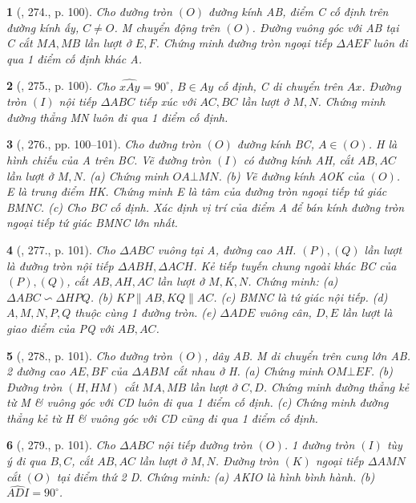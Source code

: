 \documentclass{article}
\newtheorem{baitoan}{}
\begin{document}
\begin{baitoan}[\cite{Binh_Toan_9_tap_2}, 274., p. 100]
	Cho đường tròn $(O)$ đường kính AB, điểm C cố định trên đường kính ấy, $C\ne O$. M chuyển động trên $(O)$. Đường vuông góc với AB tại C cắt $MA,MB$ lần lượt ở $E,F$. Chứng minh đường tròn ngoại tiếp $\Delta AEF$ luôn đi qua 1 điểm cố định khác A.
\end{baitoan}

\begin{baitoan}[\cite{Binh_Toan_9_tap_2}, 275., p. 100]
	Cho $\widehat{xAy} = 90^\circ$, $B\in Ay$ cố định, C di chuyển trên $Ax$. Đường tròn $(I)$ nội tiếp $\Delta ABC$ tiếp xúc với $AC,BC$ lần lượt ở $M,N$. Chứng minh đường thẳng MN luôn đi qua 1 điểm cố định.
\end{baitoan}

\begin{baitoan}[\cite{Binh_Toan_9_tap_2}, 276., pp. 100--101]
	Cho đường tròn $(O)$ đường kính BC, $A\in(O)$. H là hình chiếu của A trên BC. Vẽ đường tròn $(I)$ có đường kính AH, cắt $AB,AC$ lần lượt ở $M,N$. (a) Chứng minh $OA\bot MN$. (b) Vẽ đường kính AOK của $(O)$. E là trung điểm HK. Chứng minh E là tâm của đường tròn ngoại tiếp tứ giác BMNC. (c) Cho BC cố định. Xác định vị trí của điểm A để bán kính đường tròn ngoại tiếp tứ giác BMNC lớn nhất.
\end{baitoan}

\begin{baitoan}[\cite{Binh_Toan_9_tap_2}, 277., p. 101]
	Cho $\Delta ABC$ vuông tại A, đường cao AH. $(P),(Q)$ lần lượt là đường tròn nội tiếp $\Delta ABH,\Delta ACH$. Kẻ tiếp tuyến chung ngoài khác BC của $(P),(Q)$, cắt $AB,AH,AC$ lần lượt ở $M,K,N$. Chứng minh: (a) $\Delta ABC\backsim\Delta HPQ$. (b) $KP\parallel AB,KQ\parallel AC$. (c) BMNC là tứ giác nội tiếp. (d) $A,M,N,P,Q$ thuộc cùng 1 đường tròn. (e) $\Delta ADE$ vuông cân, $D,E$ lần lượt là giao điểm của PQ với $AB,AC$.
\end{baitoan}

\begin{baitoan}[\cite{Binh_Toan_9_tap_2}, 278., p. 101]
	Cho đường tròn $(O)$, dây AB. M di chuyển trên cung lớn AB. 2 đường cao $AE,BF$ của $\Delta ABM$ cắt nhau ở H. (a) Chứng minh $OM\bot EF$. (b) Đường tròn $(H,HM)$ cắt $MA,MB$ lần lượt ở $C,D$. Chứng minh đường thẳng kẻ từ M \& vuông góc với CD luôn đi qua 1 điểm cố định. (c) Chứng minh đường thẳng kẻ từ H \& vuông góc với CD cũng đi qua 1 điểm cố định.
\end{baitoan}

\begin{baitoan}[\cite{Binh_Toan_9_tap_2}, 279., p. 101]
	Cho $\Delta ABC$ nội tiếp đường tròn $(O)$. 1 đường tròn $(I)$ tùy ý đi qua $B,C$, cắt $AB,AC$ lần lượt ở $M,N$. Đường tròn $(K)$ ngoại tiếp $\Delta AMN$ cắt $(O)$ tại điểm thứ 2 D. Chứng minh: (a) AKIO là hình bình hành. (b) $\widehat{ADI} = 90^\circ$. 
\end{baitoan}
\end{document}
